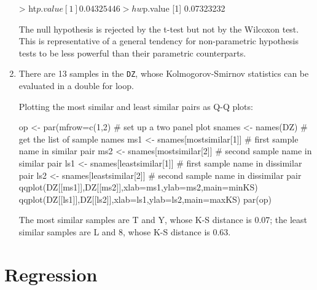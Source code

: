 \begin{enumerate}
\begin{console}
> ht$p.value
[1] 0.04325446
> hw$p.value
[1] 0.07323232
\end{console}

The null hypothesis is rejected by the t-test but not by the Wilcoxon
test. This is representative of a general tendency for non-parametric
hypothesis tests to be less powerful than their parametric
counterparts.
  
\item\label{it:sol-DZ-MDS} There are 13 samples in the \texttt{DZ},
  whose Kolmogorov-Smirnov statistics can be evaluated in a double for
  loop.


Plotting the most similar and least similar pairs as Q-Q plots:

\begin{script}[firstnumber=17]
op <- par(mfrow=c(1,2)          # set up a two panel plot
snames <- names(DZ)             # get the list of sample names
ms1 <- snames[mostsimilar[1]]   # first sample name in similar pair
ms2 <- snames[mostsimilar[2]]   # second sample name in similar pair
ls1 <- snames[leastsimilar[1]]  # first sample name in dissimilar pair
ls2 <- snames[leastsimilar[2]]  # second sample name in dissimilar pair
qqplot(DZ[[ms1]],DZ[[ms2]],xlab=ms1,ylab=ms2,main=minKS)
qqplot(DZ[[ls1]],DZ[[ls2]],xlab=ls1,ylab=ls2,main=maxKS)
par(op)
\end{script}

The most similar samples are T and Y, whose K-S distance is 0.07; the
least similar samples are L and 8, whose K-S distance is 0.63.

\end{enumerate}

\section{Regression}
\label{sec:sol-regression}

